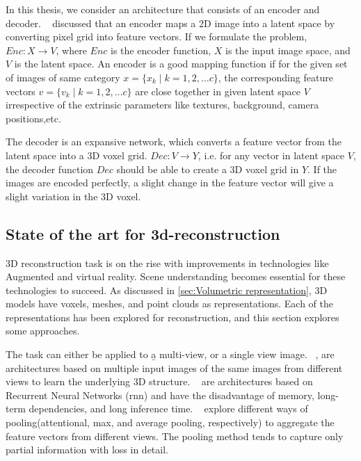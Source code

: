 In this thesis, we consider an architecture that consists of an encoder and decoder.
~\cite{Han2021ImageBased3O} discussed that an encoder maps a 2D image into a latent space by converting pixel grid into feature vectors.
If we formulate the problem, $Enc: X \to V$, where $Enc$ is the encoder function, $X$ is the input image space, and $V$ is the latent space.
An encoder is a good mapping function if for the given set of images of same category $x = \{x_k \mid k = 1,2,\dots c\}$, the corresponding feature vectors $v = \{v_k \mid k = 1,2,\dots c\}$ are close together in given latent space $V$
irrespective of the extrinsic parameters like textures, background, camera positions,etc.

The decoder is an expansive network, which converts a feature vector from the latent space into a 3D voxel grid.
$Dec: V \to Y$, i.e. for any vector in latent space $V$, the decoder function \textbf{$Dec$} should be able to create a 3D voxel grid in $Y$.
If the images are encoded perfectly, a slight change in the feature vector will give a slight variation in the 3D voxel.

\subsection{State of the art for 3d-reconstruction}\label{sec:state_of_the_art}

3D reconstruction task is on the rise with improvements in technologies like Augmented and virtual reality.
Scene understanding becomes essential for these technologies to succeed.
As discussed in \autoref{sec:Volumetric representation}, 3D models have voxels, meshes, and point clouds as representations.
Each of the representations has been explored for reconstruction, and this section explores some approaches.

The task can either be applied to \b{a multi-view, or a single view image}.
~\cite{Kar2017, choy20163d, Yang_2019, Huang2018, Paschalidou2018RayNetLV, Xie_2019, Xie_2020},
are architectures based on multiple input images of the same images from different views to learn the underlying 3D structure.
~\cite{Kar2017, choy20163d} are architectures based on Recurrent Neural Networks (\gls{rnn}) and have the disadvantage of memory,
long-term dependencies, and long inference time.
~\cite{Yang_2019, Huang2018, Paschalidou2018RayNetLV} explore different ways of pooling(attentional, max, and average pooling, respectively)
to aggregate the feature vectors from different views.
The pooling method tends to capture only partial information with loss in detail.

